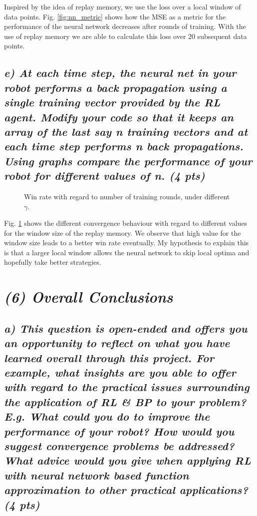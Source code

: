 \documentclass[a4paper,12pt]{article}
\begin{document}
Inspired by the idea of replay memory, we use the loss over a local window of data points. Fig. \ref{fig:nn_metric} shows how the MSE as a metric for the performance of the neural network decreases after rounds of training. With the use of replay memory we are able to calculate this loss over 20 subsequent data points.

\pagebreak
\subsection*{\emph{e) At each time step, the neural net in your robot performs a back propagation using a single training vector provided by the RL agent. Modify your code so that it keeps an array of the last say n training vectors and at each time step performs n back propagations. Using graphs compare the performance of your robot for different values of n. (4 pts)}}

\begin{figure}[hbt!]
\caption{Win rate with regard to number of training rounds, under different $\gamma$.}
\label{fig:win_rate_n}
\end{figure}

Fig. \ref{fig:win_rate_n} shows the different convergence behaviour with regard to different values for the window size of the replay memory. We observe that high value for the window size leads to a better win rate eventually. My hypothesis to explain this is that a larger local window allows the neural network to skip local optima and hopefully take better strategies. 

\pagebreak
\section*{\emph{(6) Overall Conclusions}}
\subsection*{\emph{a) This question is open-ended and offers you an opportunity to reflect on what you have learned overall through this project. For example, what insights are you able to offer with regard to the practical issues surrounding the application of RL \& BP to your problem? E.g. What could you do to improve the performance of your robot? How would you suggest convergence problems be addressed? What advice would you give when applying RL with neural network based function approximation to other practical applications? (4 pts)}}
\end{document}
